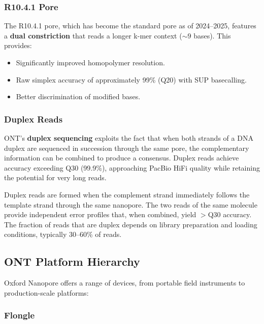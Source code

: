 \subsubsection{R10.4.1 Pore}

The R10.4.1 pore, which has become the standard pore as of 2024--2025, features a \textbf{dual constriction} that reads a longer k-mer context (${\sim}9$ bases). This provides:

\begin{itemize}[nosep]
  \item Significantly improved homopolymer resolution.
  \item Raw simplex accuracy of approximately 99\% (Q20) with SUP basecalling.
  \item Better discrimination of modified bases.
\end{itemize}

\subsubsection{Duplex Reads}

ONT's \textbf{duplex sequencing} exploits the fact that when both strands of a DNA duplex are sequenced in succession through the same pore, the complementary information can be combined to produce a consensus. Duplex reads achieve accuracy exceeding Q30 (99.9\%), approaching PacBio HiFi quality while retaining the potential for very long reads.

\begin{keyconcept}[title={Duplex Reads: ONT's Answer to HiFi}]
Duplex reads are formed when the complement strand immediately follows the template strand through the same nanopore. The two reads of the same molecule provide independent error profiles that, when combined, yield $>$Q30 accuracy. The fraction of reads that are duplex depends on library preparation and loading conditions, typically 30--60\% of reads.
\end{keyconcept}

\subsection{ONT Platform Hierarchy}

Oxford Nanopore offers a range of devices, from portable field instruments to production-scale platforms:

\subsubsection{Flongle}

